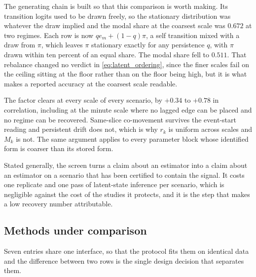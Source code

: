 The generating chain is built so that this comparison is worth making. Its
transition logits used to be drawn freely, so the stationary distribution was
whatever the draw implied and the modal share at the coarsest scale was
\(0.672\) at two regimes. Each row is now \(q e_m + (1 - q)\pi\), a self
transition mixed with a draw from \(\pi\), which leaves \(\pi\) stationary
exactly for any persistence \(q\), with \(\pi\) drawn within ten percent of an
equal share. The modal share fell to \(0.511\). That rebalance changed no verdict
in \eqref{eq:latent_ordering}, since the finer scales fail on the ceiling sitting
at the floor rather than on the floor being high, but it is what makes a reported
accuracy at the coarsest scale readable.

The factor clears at every scale of every scenario, by \(+0.34\) to \(+0.78\) in
correlation, including at the minute scale where no lagged edge can be placed and
no regime can be recovered. Same-slice co-movement survives the event-start
reading and persistent drift does not, which is why \(r_k\) is uniform across
scales and \(M_k\) is not. The same argument applies to every parameter block
whose identified form is coarser than its stored form.

Stated generally, the screen turns a claim about an estimator into a claim
about an estimator on a scenario that has been certified to contain the signal.
It costs one replicate and one pass of latent-state inference per scenario,
which is negligible against the cost of the studies it protects, and it is the
step that makes a low recovery number attributable.

\subsection{Methods under comparison}
\label{sec:benchmark_methods}

Seven entries share one interface, so that the protocol fits them on identical
data and the difference between two rows is the single design decision that
separates them.

